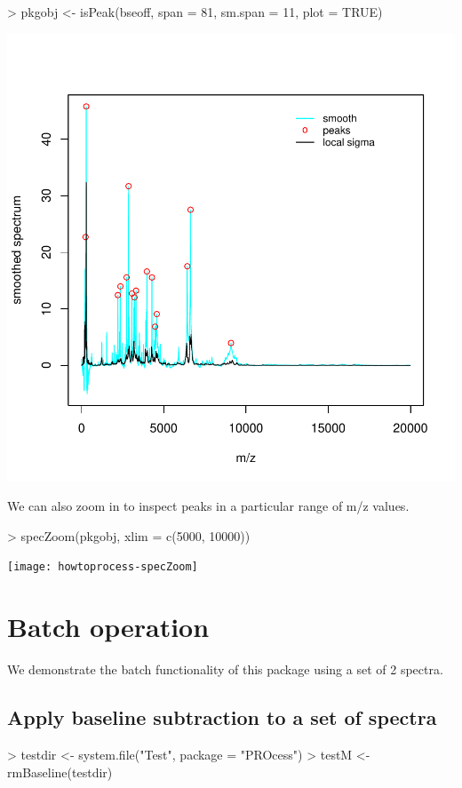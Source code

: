 \documentclass[12pt]{article}
\begin{document}
\begin{Schunk}
\begin{Sinput}
> pkgobj <- isPeak(bseoff, span = 81, sm.span = 11, plot = TRUE)
\end{Sinput}
\end{Schunk}
\includegraphics{howtoprocess-isPeakSingle}

We can also zoom in to inspect peaks in a particular range of 
m/z values.
\begin{Schunk}
\begin{Sinput}
> specZoom(pkgobj, xlim = c(5000, 10000))
\end{Sinput}
\end{Schunk}
\texttt{[image: howtoprocess-specZoom]}

\section{Batch operation}
We demonstrate the batch functionality of this package using
a set of 2 spectra.
\subsection{Apply baseline subtraction to a set of spectra}
\begin{Schunk}
\begin{Sinput}
> testdir <- system.file("Test", package = "PROcess")
> testM <- rmBaseline(testdir)
\end{Sinput}
\end{Schunk}
\end{document}

